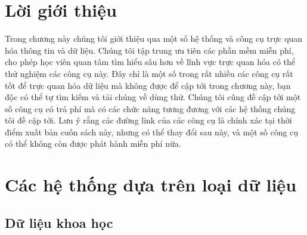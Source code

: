 \documentclass[13pt]{scrartcl} %
\begin{document}

\date{ }
\tableofcontents

\pagebreak

\section{Lời giới thiệu}
Trong chương này chúng tôi giới thiệu qua một số hệ thống và công cụ trực quan hóa thông tin và dữ liệu. Chúng tôi tập trung ưu tiên các phần mềm miễn phí, cho phép học viên quan tâm tìm hiểu sâu hơn về lĩnh vực trực quan hóa có thể thử nghiệm các công cụ này. Đây chỉ là một số trong rất nhiều các công cụ rất tốt để trực quan hóa dữ liệu mà không được để cập tới trong chương này, bạn độc có thể tự tìm kiếm và tải chúng về dùng thử. Chúng tôi cũng đề cập tới một số công cụ có trả phí mà có các chức năng tương đương với các hệ thống chúng tôi đề cập tới. Lưu ý rằng các đường link của các công cụ là chính xác tại thời điểm xuất bản cuốn sách này, nhưng có thể thay đổi sau này, và một số công cụ có thể không còn được phát hành miễn phí nữa.


\section{Các hệ thống dựa trên loại dữ liệu}

\subsection{Dữ liệu khoa học}
\end{document}

